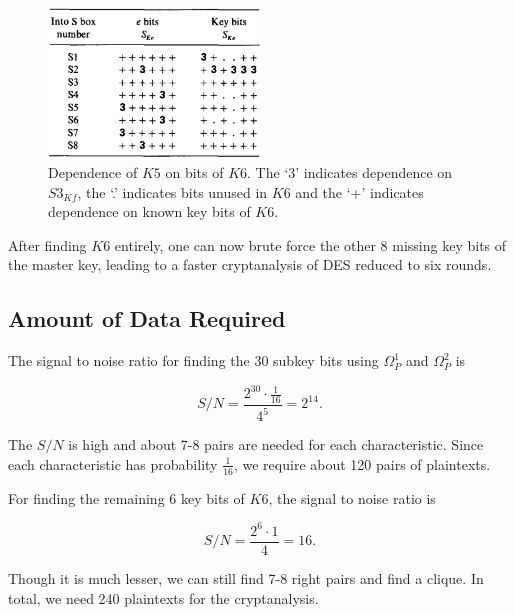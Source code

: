 \documentclass[twoside]{article}
\begin{document}
\begin{figure}[!ht]
    \centering
    \includegraphics[width=0.5\textwidth]{images/des_k5.png}
    \caption{Dependence of \(K5\) on bits of \(K6\). The `3' indicates 
    dependence on \(S3_{Kf}\), the `.' indicates bits unused in \(K6\) and the 
    `+' indicates dependence on known key bits of \(K6\).}
    \label{fig:des-k5}
\end{figure}

After finding \(K6\) entirely, one can now brute force the other 8 missing key 
bits of the master key, leading to a faster cryptanalysis of DES reduced to 
six rounds.

\subsection{Amount of Data Required}
The signal to noise ratio for finding the 30 subkey bits using \(\Omega_P^1\) 
and \(\Omega_P^2\) is

\begin{equation}
    S/N = \frac{2^{30} \cdot \frac{1}{16}}{4^5} = 2^{14}.
    \label{eq:des-6-sn1}
\end{equation}

The \(S/N\) is high and about 7-8 pairs are needed for each characteristic. 
Since each characteristic has probability \(\frac{1}{16}\), we require about 
120 pairs of plaintexts.

For finding the remaining 6 key bits of \(K6\), the signal to noise ratio is

\begin{equation}
    S/N = \frac{2^6 \cdot 1}{4} = 16.
    \label{eq:des-6-sn2}
\end{equation}

Though it is much lesser, we can still find 7-8 right pairs and find a clique.
In total, we need 240 plaintexts for the cryptanalysis.
\end{document}
